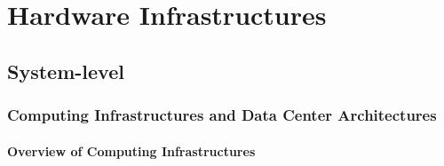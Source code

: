 \section{Hardware Infrastructures}

\subsection{System-level}

\subsubsection{Computing Infrastructures and Data Center Architectures}

\paragraph{Overview of Computing Infrastructures}


